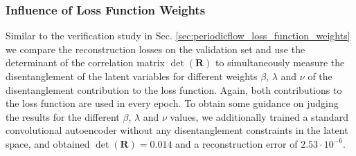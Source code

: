 \subsubsection{Influence of Loss Function Weights}
Similar to the verification study in Sec. \ref{sec:periodicflow_loss_function_weights} we compare the reconstruction losses on the validation set and use the determinant of the correlation matrix $\det(\mathbf{R})$ to simultaneously  measure the disentanglement of the latent variables for different weights $\beta$, $\lambda$ and $\nu$ of the disentanglement contribution to the loss
function.  Again, both contributions to the loss function are used in every epoch.  To obtain some guidance on judging the results for the different $\beta$, $\lambda$ and $\nu$ values, we additionally trained a standard convolutional autoencoder without any disentanglement constraints in the latent space, and obtained $\det(\mathbf{R})=0.014$ and a reconstruction error of $2.53\cdot10^{-6}$. 

